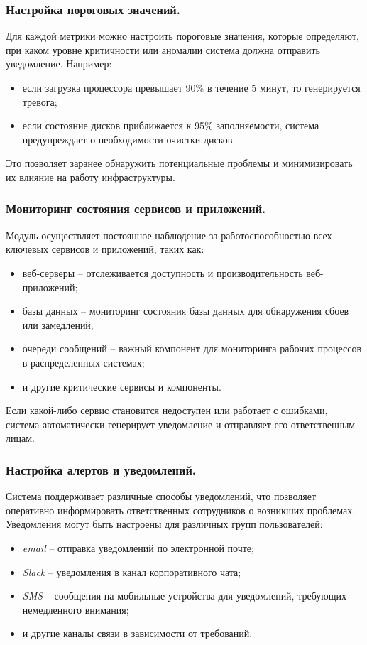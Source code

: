 \subsubsection{Настройка пороговых значений.} Для каждой метрики можно настроить пороговые значения, которые определяют, при каком уровне критичности или аномалии система должна отправить уведомление. Например:
\begin{itemize}
    \item если загрузка процессора превышает 90\% в течение 5 минут, то генерируется тревога;
    \item если состояние дисков приближается к 95\% заполняемости, система предупреждает о необходимости очистки дисков.
\end{itemize}

Это позволяет заранее обнаружить потенциальные проблемы и минимизировать их влияние на работу инфраструктуры.

\subsubsection{Мониторинг состояния сервисов и приложений.} Модуль осуществляет постоянное наблюдение за работоспособностью всех ключевых сервисов и приложений, таких как:
\begin{itemize}
    \item веб-серверы -- отслеживается доступность и производительность веб-приложений;
    \item базы данных -- мониторинг состояния базы данных для обнаружения сбоев или замедлений;
    \item очереди сообщений -- важный компонент для мониторинга рабочих процессов в распределенных системах;
    \item и другие критические сервисы и компоненты.
\end{itemize}

Если какой-либо сервис становится недоступен или работает с ошибками, система автоматически генерирует уведомление и отправляет его ответственным лицам.

\subsubsection{Настройка алертов и уведомлений.} Система поддерживает различные способы уведомлений, что позволяет оперативно информировать ответственных сотрудников о возникших проблемах. Уведомления могут быть настроены для различных групп пользователей:
\begin{itemize}
    \item \textit{email} -- отправка уведомлений по электронной почте;
    \item \textit{Slack} -- уведомления в канал корпоративного чата;
    \item \textit{SMS} -- сообщения на мобильные устройства для уведомлений, требующих немедленного внимания;
    \item и другие каналы связи в зависимости от требований.
\end{itemize}

